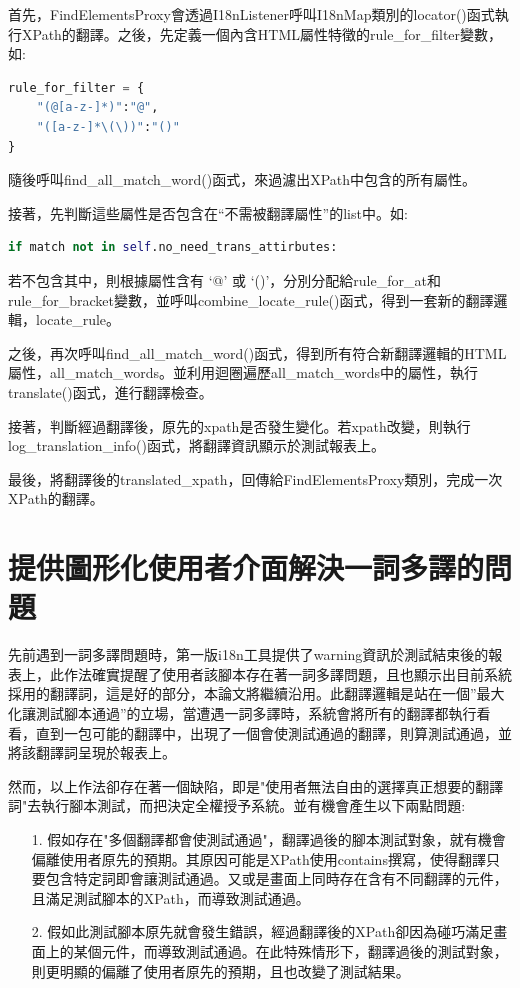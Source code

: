 首先，FindElementsProxy會透過I18nListener呼叫I18nMap類別的locator()函式執行XPath的翻譯。之後，先定義一個內含HTML屬性特徵的rule\_for\_filter變數，如:
\begin{lstlisting}[language={python}]
rule_for_filter = {
    "(@[a-z-]*)":"@",
    "([a-z-]*\(\))":"()"
}
\end{lstlisting}
隨後呼叫find\_all\_match\_word()函式，來過濾出XPath中包含的所有屬性。

接著，先判斷這些屬性是否包含在“不需被翻譯屬性”的list中。如:
\begin{lstlisting}[language={python}]
if match not in self.no_need_trans_attirbutes:
\end{lstlisting}

若不包含其中，則根據屬性含有 ‘@’ 或 ‘()’，分別分配給rule\_for\_at和rule\_for\_bracket變數，並呼叫combine\_locate\_rule()函式，得到一套新的翻譯邏輯，locate\_rule。

之後，再次呼叫find\_all\_match\_word()函式，得到所有符合新翻譯邏輯的HTML屬性，all\_match\_words。並利用迴圈遍歷all\_match\_words中的屬性，執行translate()函式，進行翻譯檢查。
	
接著，判斷經過翻譯後，原先的xpath是否發生變化。若xpath改變，則執行log\_translation\_info()函式，將翻譯資訊顯示於測試報表上。

最後，將翻譯後的translated\_xpath，回傳給FindElementsProxy類別，完成一次XPath的翻譯。

\section{提供圖形化使用者介面解決一詞多譯的問題}
先前遇到一詞多譯問題時，第一版i18n工具提供了warning資訊於測試結束後的報表上，此作法確實提醒了使用者該腳本存在著一詞多譯問題，且也顯示出目前系統採用的翻譯詞，這是好的部分，本論文將繼續沿用。此翻譯邏輯是站在一個”最大化讓測試腳本通過”的立場，當遭遇一詞多譯時，系統會將所有的翻譯都執行看看，直到一包可能的翻譯中，出現了一個會使測試通過的翻譯，則算測試通過，並將該翻譯詞呈現於報表上。

然而，以上作法卻存在著一個缺陷，即是"使用者無法自由的選擇真正想要的翻譯詞"去執行腳本測試，而把決定全權授予系統。並有機會產生以下兩點問題:
\begin{itemize}
\item[1.]假如存在"多個翻譯都會使測試通過"，翻譯過後的腳本測試對象，就有機會偏離使用者原先的預期。其原因可能是XPath使用contains撰寫，使得翻譯只要包含特定詞即會讓測試通過。又或是畫面上同時存在含有不同翻譯的元件，且滿足測試腳本的XPath，而導致測試通過。 
\item[2.]假如此測試腳本原先就會發生錯誤，經過翻譯後的XPath卻因為碰巧滿足畫面上的某個元件，而導致測試通過。在此特殊情形下，翻譯過後的測試對象，則更明顯的偏離了使用者原先的預期，且也改變了測試結果。 
\end{itemize}

